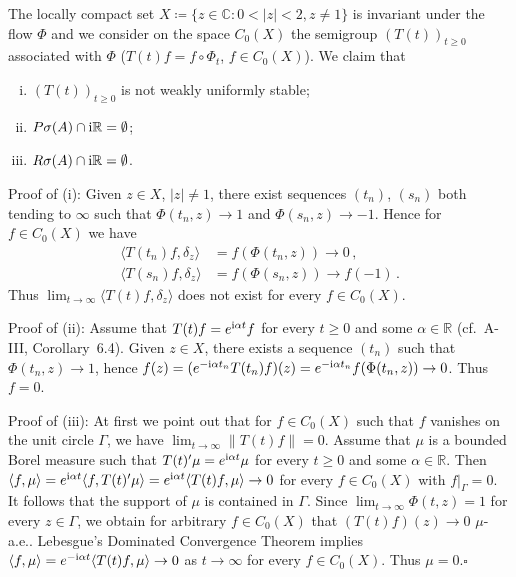 \begin{example}
\begin{enumerate}[(a), wide, labelsep=1em, itemindent=\parindent]
The locally compact set $X \coloneq
 \{z \in \mathbb{C} \colon 0  <  |z|  <  2, z \neq 1\}$ is invariant under the flow $\Phi$ and we consider on the space $C_{0}(X)$ the semigroup $(T(t))_{t \geq 0}$ associated with $\Phi$ (\ie $T(t)f = f\circ\Phi_t$, $f \in C_{0}(X)$). 
 We claim that
\begin{enumerate}[(i)]
	\item
	$(T(t))_{t \geq 0}$ is not weakly uniformly stable;
	
	\item 
	$P\sigma(A)\cap\mathrm{i}\mathbb{R} = \emptyset$;
	
	\item 
	$R\sigma(A)\cap\mathrm{i}\mathbb{R} = \emptyset$.
\end{enumerate}

Proof of (i): Given $z \in X$, $|z| \neq 1$, there exist sequences $(t_n)$, $(s_n)$ both tending to $\infty$ such that $\Phi(t_n,z) \to 1$ and $\Phi(s_n,z) \to -1$. 
Hence for $f \in C_{0}(X)$ we have
\[
   \begin{aligned}
   \langle T(t_n)f,\delta_z \rangle &= f(\Phi(t_n,z)) \to 0\,,\\
   \langle T(s_n)f,\delta_z \rangle &= f(\Phi(s_n,z)) \to f(-1)\,.
   \end{aligned}
\]
Thus $\lim_{t\to\infty} \langle T(t)f,\delta_z \rangle$ does not exist for every $f \in C_{0}(X)$.

Proof of (ii): Assume that $T(t)f = e^{\mathrm{i}\alpha t}f$ for every $t \geq 0$ and some $\alpha \in \mathbb{R}$ (cf.\ A-III, Corollary~6.4). 
Given $z \in X$, there exists a sequence $(t_n)$ such that $\Phi(t_n,z) \to 1$, hence
%
$f(z) = (e^{-\mathrm{i}\alpha t_n}T(t_n)f)(z) = e^{-\mathrm{i}\alpha t_n}f(\Phi(t_n,z)) \to 0$. Thus $f = 0$.

Proof of (iii): At first we point out that for $f \in C_{0}(X)$ such that $f$ vanishes on the unit circle $\Gamma$, we have $\lim_{t\to\infty} \|T(t)f\| = 0$.
Assume that $\mu$ is a bounded Borel measure such that $T(t)'\mu = e^{\mathrm{i}\alpha t}\mu$ for every $t \geq 0$ and some $\alpha \in \mathbb{R}$. 
Then $\langle f,\mu \rangle = e^{\mathrm{i}\alpha t}\langle f,T(t)'\mu \rangle = e^{\mathrm{i}\alpha t}\langle T(t)f,\mu \rangle \to 0$ for every $f \in C_{0}(X)$ with $f|_\Gamma = 0$. 
It follows that the support of $\mu$ is contained in $\Gamma$. Since $\lim_{t\to\infty} \Phi(t,z) = 1$ for every $z \in \Gamma$, we obtain for arbitrary $f \in C_{0}(X)$ that $(T(t)f)(z) \to 0$ $\mu$-a.e.. 
Lebesgue's Dominated Convergence Theorem implies $\langle f,\mu \rangle = e^{-\mathrm{i}\alpha t}\langle T(t)f,\mu \rangle \to 0$ as $t \to \infty$ for every $f \in C_{0}(X)$. Thus $\mu = 0$.\hfill$\square$
\end{enumerate}
\end{example}

